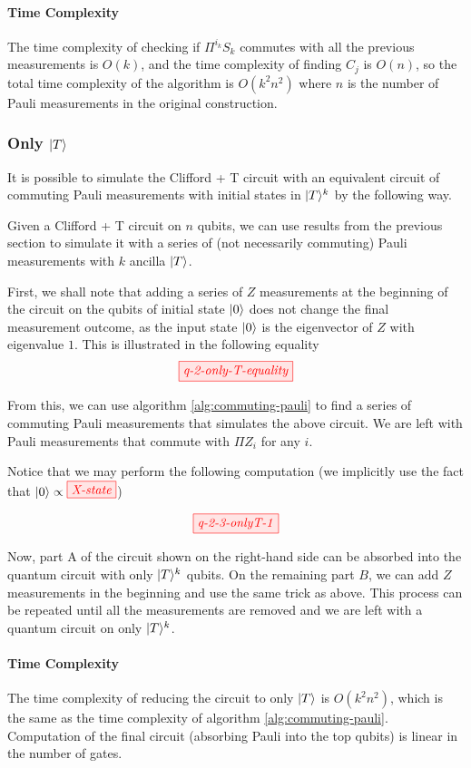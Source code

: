 \paragraph{Time Complexity}

The time complexity of checking if $\Pi^{i_k} S_k$ commutes with all the previous measurements is $O(k)$, and the time complexity of finding $C_j$ is $O(n)$, so the total time complexity of the algorithm is $O(k^2n^2)$ where $n$ is the number of Pauli measurements in the original construction.

\subsubsection{Only \texorpdfstring{$|T\rangle$}{}}

It is possible to simulate the Clifford + T circuit with an equivalent circuit of commuting Pauli measurements with initial states in $|T\rangle^{k}$ by the following way.



Given a Clifford + T circuit on $n$ qubits, we can use results from the previous section to simulate it with a series of (not necessarily commuting) Pauli measurements with $k$ ancilla $|T\rangle$.

First, we shall note that adding a series of $Z$ measurements at the beginning of the circuit on the qubits of initial state $|0\rangle$ does not change the final measurement outcome, as the input state $|0\rangle$ is the eigenvector of $Z$ with eigenvalue $1$.
This is illustrated in the following equality
\begin{equation*}
	\tikzfig{q-2-only-T-equality}
\end{equation*}

From this, we can use algorithm \ref{alg:commuting-pauli} to find a series of commuting Pauli measurements that simulates the above circuit. 
We are left with Pauli measurements that commute with $\Pi Z_i$ for any $i$.

Notice that we may perform the following computation (we implicitly use the fact that $\ket{0} \propto \tikzfig{X-state}$)

\begin{align*}
	\tikzfig{q-2-3-onlyT-1}
\end{align*}

Now, part A of the circuit shown on the right-hand side can be absorbed into the quantum circuit with only $|T\rangle^k$ qubits. 
On the remaining part $B$, we can add $Z$ measurements in the beginning and use the same trick as above.
This process can be repeated until all the measurements are removed and we are left with a quantum circuit on only $|T\rangle^k$.

\paragraph{Time Complexity}

The time complexity of reducing the circuit to only $|T\rangle$ is $O(k^2n^2)$, which is the same as the time complexity of algorithm \ref{alg:commuting-pauli}.
Computation of the final circuit (absorbing Pauli into the top qubits) is linear in the number of gates.
